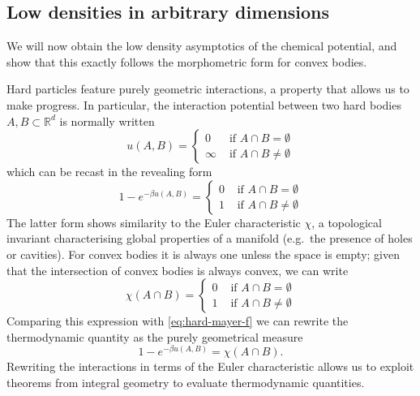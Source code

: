\documentclass[11pt,twoside]{report}
\begin{document}
\subsection{Low densities in arbitrary dimensions}
\label{sec:low-densities}

We will now obtain the low density asymptotics of the chemical potential, and show that this exactly follows the morphometric form for convex bodies.

Hard particles feature purely geometric interactions, a property that allows us to make progress.
In particular, the interaction potential between two hard bodies $A,B \subset \mathbb{R}^d$ is normally written
\begin{equation*}\label{eq:hard-mayer-f}
  u(A,B)
  =
  \begin{cases}
    0 & \textrm{ if } A \cap B = \emptyset \\
    \infty & \textrm{ if } A \cap B \ne \emptyset
  \end{cases}
\end{equation*}
which can be recast in the revealing form
\begin{equation*}\label{eq:hard-mayer-f}
  1 - e^{-\beta u(A,B)}
  =
  \begin{cases}
    0 & \textrm{ if } A \cap B = \emptyset \\
    1 & \textrm{ if } A \cap B \ne \emptyset
  \end{cases}
\end{equation*}
The latter form shows similarity to the Euler characteristic $\chi$, a topological invariant characterising global properties of a manifold (e.g.\ the presence of holes or cavities).
For convex bodies it is always one unless the space is empty; given that the intersection of convex bodies is always convex, we can write
\begin{equation*}
  \chi(A \cap B) =
    \begin{cases}
    0 & \textrm{ if } A \cap B = \emptyset \\
    1 & \textrm{ if } A \cap B \ne \emptyset
    \end{cases}
\end{equation*}
Comparing this expression with \eqref{eq:hard-mayer-f} we can rewrite the thermodynamic quantity as the purely geometrical measure
\begin{equation}\label{eq:chi-replacement}
  1 - e^{-\beta u(A,B)} = \chi(A \cap B).
\end{equation}
Rewriting the interactions in terms of the Euler characteristic allows us to exploit theorems from integral geometry to evaluate thermodynamic quantities.
\end{document}
